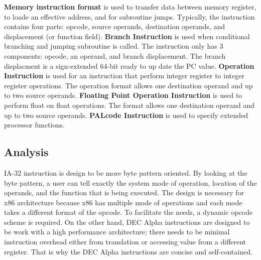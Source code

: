 \documentclass[letterpaper,10pt,titlepage]{article}
\begin{document}

\textbf{Memory instruction format} is used to transfer data between memory register,
to loade an effective address, and for subroutine jumps. Typically, the instruction 
contains four parts: opcode, source operands, destination operands, and displacement
(or function field). \textbf{Branch Instruction} is used when conditional branching 
and jumping subroutine is called. The instruction only has 3 components: opcode, 
an operand, and branch displacement. The branch displacment is a sign-extended 64-bit
ready to up date the PC value. \textbf{Operation Instruction} is used for an instruction
that perform integer register to integer register operations. The operation format allows
one destination operand and up to two source operands. \textbf{Floating Point Operation
Instruction} is used to perform float on float operations. The format allows one 
destination operand and up to two source operands. \textbf{PALcode Instruction} is used
to specify extended processor functions. 


\subsection{Analysis}
IA-32 instruction is design to be more byte pattern oriented. 
By looking at the byte pattern, a user can tell exactly the system mode of operation,
location of the operands, and the function that is being executed. 
The design is necessary for x86 architecture because x86 has multiple mode of operations
and each mode takes a different format of the opcode. To facilitate the needs, a dynamic
opcode scheme is required. On the other hand, DEC Alpha instructions are designed to be
work with a high performance architecture; there needs to be minimal instruction overhead 
either from translation or accessing value from a different register. That is why the 
DEC Alpha instructions are concise and self-contained.





\newpage
\nocite{*}


\end{document}
